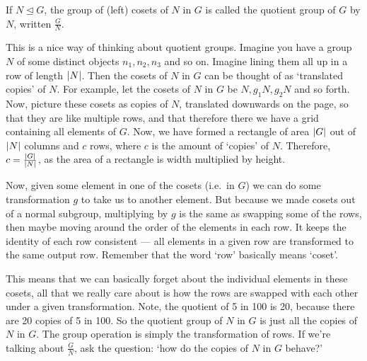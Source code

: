 \begin{definition}
	If \(N \trianglelefteq G\), the group of (left) cosets of \(N\) in \(G\) is called the quotient group of \(G\) by \(N\), written \(\frac{G}{N}\).
\end{definition}

This is a nice way of thinking about quotient groups.
Imagine you have a group \(N\) of some distinct objects \(n_1, n_2, n_3\) and so on.
Imagine lining them all up in a row of length \(\abs{N}\).
Then the cosets of \(N\) in \(G\) can be thought of as `translated copies' of \(N\).
For example, let the cosets of \(N\) in \(G\) be \(N, g_1N, g_2N\) and so forth.
Now, picture these cosets as copies of \(N\), translated downwards on the page, so that they are like multiple rows, and that therefore there we have a grid containing all elements of \(G\).
Now, we have formed a rectangle of area \(\abs{G}\) out of \(\abs{N}\) columns and \(c\) rows, where \(c\) is the amount of `copies' of \(N\).
Therefore, \(c = \frac{\abs{G}}{\abs{N}}\), as the area of a rectangle is width multiplied by height.

Now, given some element in one of the cosets (i.e.\ in \(G\)) we can do some transformation \(g\) to take us to another element.
But because we made cosets out of a normal subgroup, multiplying by \(g\) is the same as swapping some of the rows, then maybe moving around the order of the elements in each row.
It keeps the identity of each row consistent --- all elements in a given row are transformed to the same output row.
Remember that the word `row' basically means `coset'.

This means that we can basically forget about the individual elements in these cosets, all that we really care about is how the rows are swapped with each other under a given transformation.
Note, the quotient of 5 in 100 is 20, because there are 20 copies of 5 in 100.
So the quotient group of \(N\) in \(G\) is just all the copies of \(N\) in \(G\).
The group operation is simply the transformation of rows.
If we're talking about \(\frac{G}{N}\), ask the question: `how do the copies of \(N\) in \(G\) behave?'

